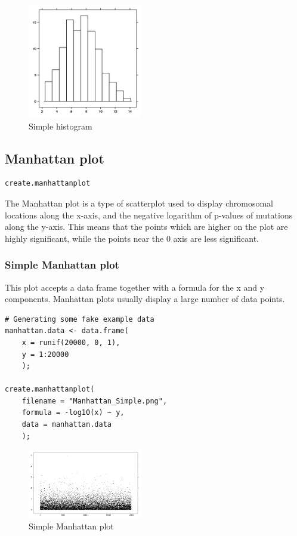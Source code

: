 \documentclass[letterpaper]{article}
\begin{document}
\begin{figure}[!ht]
  \begin{center}
     \includegraphics[width=50mm]{Figures/Histogram_Minimal_Input.png}
     \caption{Simple histogram}
  \end{center}
\end{figure}

\subsection{Manhattan plot}
\begin{verbatim}
create.manhattanplot
\end{verbatim}

The Manhattan plot is a type of scatterplot used to display chromosomal locations along the x-axis, and the negative logarithm of p-values of mutations along the y-axis. This means that the points which are higher on the plot are highly significant, while the points near the 0 axis are less significant.

\subsubsection{Simple Manhattan plot}
This plot accepts a data frame together with a formula for the x and y components. Manhattan plots usually display a large number of data points.

\begin{verbatim}
# Generating some fake example data
manhattan.data <- data.frame(
    x = runif(20000, 0, 1),
    y = 1:20000
    );

create.manhattanplot(
    filename = "Manhattan_Simple.png",
    formula = -log10(x) ~ y,
    data = manhattan.data
    );
\end{verbatim}

\begin{figure}[!ht]
  \begin{center}
     \includegraphics[width=50mm]{Figures/Manhattan_Simple.png}
     \caption{Simple Manhattan plot}
  \end{center}
\end{figure}
\end{document}
